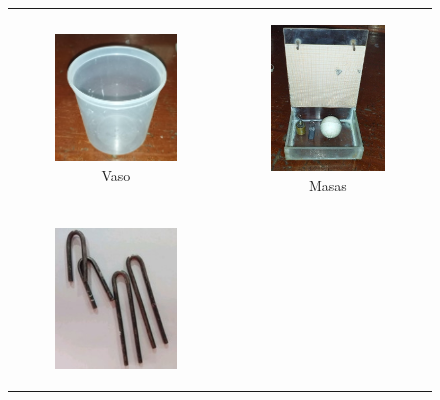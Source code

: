 \documentclass[../main.tex]{subfiles}
\begin{document}
\begin{figure}[H]
    \begin{tabular}{c c}
        \begin{subfigure}{0.5\textwidth} 
            \centering
            \includegraphics[width=0.8\linewidth,height=0.6\linewidth]{resources/mat1.jpg}
            \caption{Vaso}
            \label{fig:mat1}
        \end{subfigure}
        &
        \begin{subfigure}{0.5\textwidth} 
            \centering
            \includegraphics[width=0.8\linewidth,height=0.6\linewidth]{resources/mat2.jpg}
            \caption{Masas}
            \label{fig:mat2}
        \end{subfigure}
        \\
        \begin{subfigure}{0.5\textwidth} 
            \centering
            \includegraphics[width=0.8\linewidth,height=0.6\linewidth]{resources/mat3.jpg}

\end{subfigure}
\end{tabular}
\end{figure}
\end{document}
